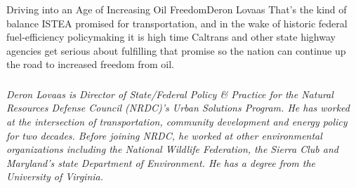 \documentclass[10pt]{papertex}
\begin{document}
\begin{news}{2}{Driving into an Age of Increasing Oil Freedom}{Deron Lovaas}{}{}
That’s the kind of balance ISTEA promised for transportation, and in the wake 
of historic federal fuel-efficiency policymaking it is high time Caltrans and 
other state highway agencies get serious about fulfilling that promise so the 
nation can continue up the road to increased freedom from oil.


\subsubsection*{}

\emph{Deron Lovaas is Director of State/Federal Policy \& Practice for the 
Natural Resources Defense Council (NRDC)’s Urban Solutions Program. He has 
worked at the intersection of transportation, community development and energy 
policy for two decades. Before joining NRDC, he worked at other environmental 
organizations including the National Wildlife Federation, the Sierra Club and 
Maryland’s state Department of Environment. He has a degree from the University 
of Virginia.}

\end{news}
\end{document}
